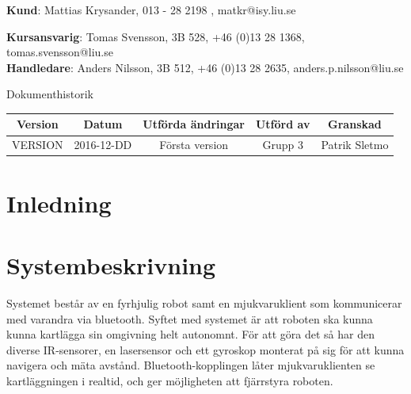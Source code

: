 \documentclass{article}
\begin{document}
\begin{center}
\textbf{Kund}: Mattias Krysander, 013 - 28 2198 , matkr@isy.liu.se
\end{center}

\begin{center}
\textbf{Kursansvarig}: Tomas Svensson, 3B 528, +46 (0)13 28 1368, tomas.svensson@liu.se \\
\textbf{Handledare}: Anders Nilsson, 3B 512, +46 (0)13 28 2635, anders.p.nilsson@liu.se
\end{center}
\vspace*{\fill}
\clearpage

\renewcommand*\contentsname{Innehållsförteckning}
\tableofcontents
\clearpage


{
\sffamily
\centering
\large


{\huge 
Dokumenthistorik \\
}
\begin{table}[H]
\centering
\begin{tabular}{ | c | c | c | c | c |} 
\hline
\textbf{Version} & \textbf{Datum} & \textbf{Utförda ändringar} & \textbf{Utförd av } & \textbf{Granskad} \\
\hline
VERSION & 2016-12-DD & Första version & Grupp 3 & Patrik Sletmo \\
\hline

\end{tabular}
\end{table}
}

\clearpage

\section{Inledning}

\section{Systembeskrivning}
Systemet består av en fyrhjulig robot samt en mjukvaruklient som kommunicerar med varandra via bluetooth.
Syftet med systemet är att roboten ska kunna kunna kartlägga sin omgivning helt autonomnt. För att göra det 
så har den diverse IR-sensorer, en lasersensor och ett gyroskop monterat på sig för att kunna navigera och mäta avstånd.
Bluetooth-kopplingen låter mjukvaruklienten se kartläggningen i realtid, och ger möjligheten att fjärrstyra roboten.
\end{document}
